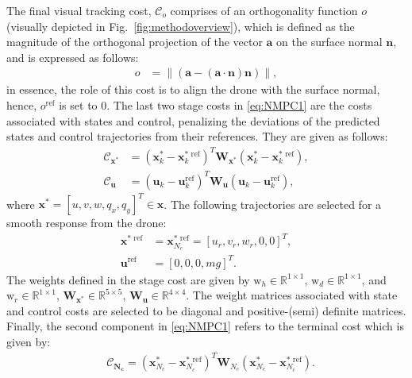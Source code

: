 \documentclass[letterpaper, 10 pt, conference]{ieeeconf}  %
\begin{document}
The final visual tracking cost, $\mathcal{C}_{o}$ comprises of an orthogonality function $o$ (visually depicted in Fig.~\ref{fig:methodoverview}), which is defined as the magnitude of the orthogonal projection of the vector $\mathbf{a}$ on the surface normal $\mathbf{n}$, and is expressed as follows:
%
\begin{align}\label{eq:orth_functon}
    o &= \|(\mathbf{a}-(\mathbf{a}\cdot \mathbf{n} )\mathbf{n})\|,
\end{align}
%
in essence, the role of this cost is to align the drone with the surface normal, hence, $o^{\textrm{ref}}$ is set to $0$. The last two stage costs in \eqref{eq:NMPC1} are the costs associated with states and control, penalizing the deviations of the predicted states and control trajectories from their references. They are given as follows:
%
\begin{align} \label{eq:NMPC1_stageCostStateControl}
	\mathcal{C}_{\mathbf{x}^{\textrm{*}}} &= (\mathbf{x}_k^{\textrm{*}} - \mathbf{x}_k^{\textrm{* ref}})^T\mathbf{W}_{\mathbf{x}^{\textrm{*}}}(\mathbf{x}_k^{\textrm{*}} - \mathbf{x}_k^{\textrm{* ref}}), \\
	\mathcal{C}_{\mathbf{u}} &= (\mathbf{u}_k - \mathbf{u}_k^{\textrm{ref}})^T\mathbf{W}_{\mathbf{u}}(\mathbf{u}_k - \mathbf{u}_k^{\textrm{ref}}),
\end{align}
%
where $\mathbf{x}^{\textrm{*}} = [u,v,w, q_x,q_y]^T \in \mathbf{x}$. The following trajectories are selected for a smooth response from the drone:
%
\begin{align} 
	\mathbf{x}^{\textrm{* ref}} &= \mathbf{x}_{N_c}^{\textrm{* ref}} =  \left[u_r,v_r,w_r,0,0 \right]^T, \label{eq:ref_x_NMPC} \\ 
	\mathbf{u}^{\textrm{ref}} &=  \left[0,0,0, mg \right]^T. \label{eq:ref_u_NMPC}
\end{align}
%
The weights defined in the stage cost are given by $ \mathrm{w}_{h} \in \mathbb{R}^{1 \times 1} $, $\mathrm{w}_{d} \in \mathbb{R}^{1 \times 1}$, and $  \mathrm{w}_{r} \in \mathbb{R}^{1 \times 1} $, $ \mathbf{W}_{\mathbf{x}^{\textrm{*}}} \in \mathbb{R}^{5 \times 5} $, $  \mathbf{W}_{\mathbf{u}} \in \mathbb{R}^{4 \times 4}$. The weight matrices associated with state and control costs are selected to be diagonal and positive-(semi) definite matrices. 
Finally, the second component in \eqref{eq:NMPC1} refers to the terminal cost which is given by: 
%
\begin{align} \label{eq:NMPC1_terminalCost}
	& \mathcal{C}_{\mathbf{N_c}} = (\mathbf{x}_{N_c}^{\textrm{*}} - \mathbf{x}_{N_c}^{\textrm{* ref}})^T\mathbf{W}_{N_c}(\mathbf{x}_{N_c}^{\textrm{*}} - \mathbf{x}_{N_c}^{\textrm{* ref}}).
\end{align}
\end{document}
